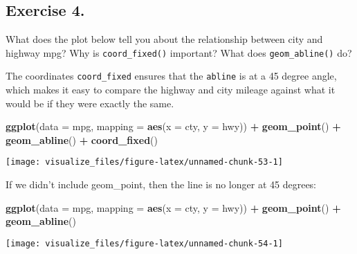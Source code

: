 \documentclass[]{book}
\newenvironment{Shaded}{\begin{snugshade}}{\end{snugshade}}
\newcommand{\DataTypeTok}[1]{\textcolor[rgb]{0.13,0.29,0.53}{#1}}
\newcommand{\KeywordTok}[1]{\textcolor[rgb]{0.13,0.29,0.53}{\textbf{#1}}}
\newcommand{\NormalTok}[1]{#1}
\newcommand{\OperatorTok}[1]{\textcolor[rgb]{0.81,0.36,0.00}{\textbf{#1}}}
\newcommand{\StringTok}[1]{\textcolor[rgb]{0.31,0.60,0.02}{#1}}
\theoremstyle{definition}
\theoremstyle{definition}
\theoremstyle{definition}
\theoremstyle{remark}
\begin{document}
\hypertarget{exercise-4.-5}{%
\subsection{Exercise 4.}\label{exercise-4.-5}}

What does the plot below tell you about the relationship between city
and highway mpg? Why is \texttt{coord\_fixed()} important? What does
\texttt{geom\_abline()} do?

The coordinates \texttt{coord\_fixed} ensures that the \texttt{abline}
is at a 45 degree angle, which makes it easy to compare the highway and
city mileage against what it would be if they were exactly the same.

\begin{Shaded}
\begin{Highlighting}[]
\KeywordTok{ggplot}\NormalTok{(}\DataTypeTok{data =}\NormalTok{ mpg, }\DataTypeTok{mapping =} \KeywordTok{aes}\NormalTok{(}\DataTypeTok{x =}\NormalTok{ cty, }\DataTypeTok{y =}\NormalTok{ hwy)) }\OperatorTok{+}
\StringTok{  }\KeywordTok{geom_point}\NormalTok{() }\OperatorTok{+}\StringTok{ }
\StringTok{  }\KeywordTok{geom_abline}\NormalTok{() }\OperatorTok{+}
\StringTok{  }\KeywordTok{coord_fixed}\NormalTok{()}
\end{Highlighting}
\end{Shaded}

\begin{center}\texttt{[image: visualize\_files/figure-latex/unnamed-chunk-53-1]} \end{center}

If we didn't include geom\_point, then the line is no longer at 45
degrees:

\begin{Shaded}
\begin{Highlighting}[]
\KeywordTok{ggplot}\NormalTok{(}\DataTypeTok{data =}\NormalTok{ mpg, }\DataTypeTok{mapping =} \KeywordTok{aes}\NormalTok{(}\DataTypeTok{x =}\NormalTok{ cty, }\DataTypeTok{y =}\NormalTok{ hwy)) }\OperatorTok{+}
\StringTok{  }\KeywordTok{geom_point}\NormalTok{() }\OperatorTok{+}\StringTok{ }
\StringTok{  }\KeywordTok{geom_abline}\NormalTok{()}
\end{Highlighting}
\end{Shaded}

\begin{center}\texttt{[image: visualize\_files/figure-latex/unnamed-chunk-54-1]} \end{center}
\end{document}
